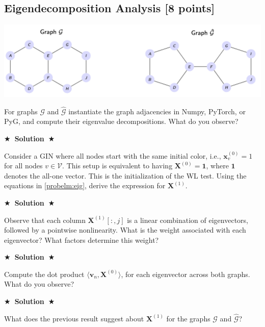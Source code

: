 \documentclass{article}
\numberwithin{figure}{section}
\newcommand{\Solution}[1]{%
    {%
        \medskip
        \color{red}
        \bf $\bigstar$~\sf\textbf{Solution}~$\bigstar$ \sf
        #1
    }
    \bigskip
}
\begin{document}
\subsection{Eigendecomposition Analysis [8 points]}

\begin{center}
    \includegraphics[scale=0.5]{expressivity-graphs.png}
\end{center}

For graphs $\mathcal{G}$ and $\hat{\mathcal{G}}$ instantiate the graph adjacencies in Numpy, PyTorch, or PyG, and compute their eigenvalue decompositions. What do you observe?

\Solution{}

Consider a GIN where all nodes start with the same initial color, i.e., $\mathbf{x}_v^{(0)} = 1$ for all nodes $v\in \mathcal{V}$. This setup is equivalent to having $\mathbf{X}^{(0)} = \mathbf{1}$, where $\mathbf{1}$ denotes the all-one vector. This is the initialization of the WL test. Using the equations in \ref{probelm:eig}, derive the expression for $\mathbf{X}^{(1)}$.

\Solution{}

Observe that each column \(\mathbf{X}^{(1)}[:,j]\) is a linear combination of eigenvectors, followed by a pointwise nonlinearity. What is the weight associated with each eigenvector? What factors determine this weight?

\Solution{}

Compute the dot product $\langle\mathbf{v}_n,\mathbf{X}^{(0)}\rangle$, for each eigenvector across both graphs. What do you observe?

\Solution{}

What does the previous result suggest about $\mathbf{X}^{(1)}$ for the graphs $\mathcal{G}$ and $\hat{\mathcal{G}}$?
\end{document}
